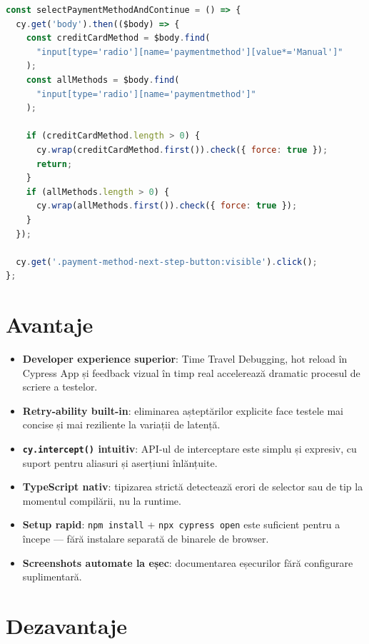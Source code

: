 \begin{lstlisting}[language=JavaScript, caption={Selecție robustă a metodei de plată}]
const selectPaymentMethodAndContinue = () => {
  cy.get('body').then(($body) => {
    const creditCardMethod = $body.find(
      "input[type='radio'][name='paymentmethod'][value*='Manual']"
    );
    const allMethods = $body.find(
      "input[type='radio'][name='paymentmethod']"
    );

    if (creditCardMethod.length > 0) {
      cy.wrap(creditCardMethod.first()).check({ force: true });
      return;
    }
    if (allMethods.length > 0) {
      cy.wrap(allMethods.first()).check({ force: true });
    }
  });

  cy.get('.payment-method-next-step-button:visible').click();
};
\end{lstlisting}

\section{Avantaje}

\begin{itemize}
    \item \textbf{Developer experience superior}: Time Travel Debugging, hot reload în Cypress App
          și feedback vizual în timp real accelerează dramatic procesul de scriere a testelor.
    \item \textbf{Retry-ability built-in}: eliminarea așteptărilor explicite face testele mai
          concise și mai reziliente la variații de latență.
    \item \textbf{\texttt{cy.intercept()} intuitiv}: API-ul de interceptare este simplu și expresiv,
          cu suport pentru aliasuri și aserțiuni înlănțuite.
    \item \textbf{TypeScript nativ}: tipizarea strictă detectează erori de selector sau de tip
          la momentul compilării, nu la runtime.
    \item \textbf{Setup rapid}: \texttt{npm install} + \texttt{npx cypress open} este suficient
          pentru a începe --- fără instalare separată de binarele de browser.
    \item \textbf{Screenshots automate la eșec}: documentarea eșecurilor fără configurare
          suplimentară.
\end{itemize}

\section{Dezavantaje}

